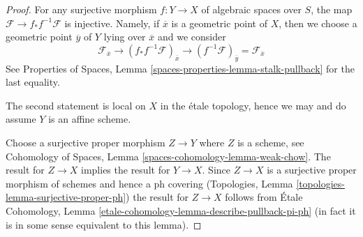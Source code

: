 \documentclass{stacks-project}
\theoremstyle{plain}
\theoremstyle{definition}
\theoremstyle{remark}
\numberwithin{equation}{subsection}
\begin{document}
\begin{proof}
For any surjective morphism $f : Y \to X$ of algebraic spaces over $S$,
the map $\mathcal{F} \to f_*f^{-1}\mathcal{F}$ is injective.
Namely, if $\overline{x}$ is a geometric point of $X$, then we
choose a geometric point $\overline{y}$ of $Y$ lying over $\overline{x}$
and we consider
$$
\mathcal{F}_{\overline{x}} \to
(f_*f^{-1}\mathcal{F})_{\overline{x}} \to
(f^{-1}\mathcal{F})_{\overline{y}} = \mathcal{F}_{\overline{x}}
$$
See Properties of Spaces, Lemma \ref{spaces-properties-lemma-stalk-pullback}
for the last equality.

\medskip\noindent
The second statement is local on $X$ in the \'etale topology, hence we may
and do assume $Y$ is an affine scheme.

\medskip\noindent
Choose a surjective proper morphism $Z \to Y$ where $Z$ is a scheme, see
Cohomology of Spaces, Lemma \ref{spaces-cohomology-lemma-weak-chow}.
The result for $Z \to X$ implies the result for $Y \to X$.
Since $Z \to X$ is a surjective proper morphism of schemes
and hence a ph covering
(Topologies, Lemma \ref{topologies-lemma-surjective-proper-ph})
the result for $Z \to X$ follows from
\'Etale Cohomology, Lemma \ref{etale-cohomology-lemma-describe-pullback-pi-ph}
(in fact it is in some sense equivalent to this lemma).
\end{proof}
\end{document}
